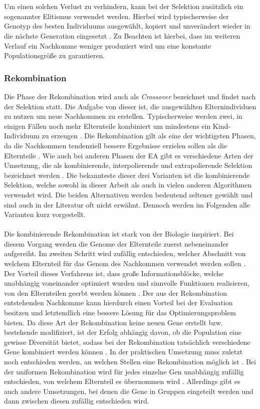 \\\\
Um einen solchen Verlust zu verhindern, kann bei der Selektion zusätzlich ein sogenannter Elitismus verwendet werden. Hierbei wird typischerweise der Genotyp des besten Individuums ausgewählt, kopiert und unverändert wieder in die nächste Generation eingesetzt \cite{such2017deep}. Zu Beachten ist hierbei, dass im weiteren Verlauf ein Nachkomme weniger produziert wird um eine konstante Populationsgröße zu garantieren. 

\subsubsection{Rekombination}
\label{subsubsec:ea_recombination}
Die Phase der Rekombination wird auch als \emph{Crossover} bezeichnet und findet nach der Selektion statt. Die Aufgabe von dieser ist, die ausgewählten Elternindividuen zu nutzen um neue Nachkommen zu erstellen. Typischerweise werden zwei, in einigen Fällen noch mehr Elternteile kombiniert um mindestens ein Kind-Individuum zu erzeugen \cite{weicker2015evolutionare}. Die Rekombination gilt als eine der wichtigsten Phasen, da die Nachkommen tendenziell bessere Ergebnisse erzielen sollen als die Elternteile \cite{russell2013kunstliche}. Wie auch bei anderen Phasen der \ac{EA} gibt es verschiedene Arten der Umsetzung, die als kombinierende, interpolierende und extrapolierende Selektion bezeichnet werden \cite{weicker2015evolutionare}. Die bekannteste dieser drei Varianten ist die kombinierende Selektion, welche sowohl in dieser Arbeit als auch in vielen anderen Algorithmen verwendet wird. Die beiden Alternativen werden bedeutend seltener gewählt und sind auch in der Literatur oft nicht erwähnt. Dennoch werden im Folgenden alle Varianten kurz vorgestellt.
\\\\
Die kombinierende Rekombination ist stark von der Biologie inspiriert. Bei diesem Vorgang werden die Genome der Elternteile zuerst nebeneinander aufgereiht. Im zweiten Schritt wird zufällig entschieden, welcher Abschnitt von welchem Elternteil für das Genom des Nachkommen verwendet werden sollen \cite{weicker2015evolutionare}. Der Vorteil dieses Verfahrens ist, dass große Informationsblöcke, welche unabhängig voneinander optimiert wurden und sinnvolle Funktionen realisieren, von den Elternteilen geerbt werden können \cite{russell2013kunstliche}. Der aus der Rekombination entstehenden Nachkomme kann hierdurch einen Vorteil bei der Evaluation besitzen und letztendlich eine bessere Lösung für das Optimierungsproblem bieten. Da diese Art der Rekombination keine neuen Gene erstellt bzw. bestehende modifiziert, ist der Erfolg abhängig davon, ob die Population eine gewisse Diversität bietet, sodass bei der Rekombination tatsächlich verschiedene Gene kombiniert werden können \cite{weicker2015evolutionare}. In der praktischen Umsetzung muss zuletzt noch entschieden werden, an welchen Stellen eine Rekombination möglich ist \cite{rojas1996neural}. Bei der uniformen Rekombination wird für jedes einzelne Gen unabhängig zufällig entschieden, von welchem Elternteil es übernommen wird \cite{weicker2015evolutionare}. Allerdings gibt es auch andere Umsetzungen, bei denen die Gene in Gruppen eingeteilt werden und dann zwischen diesen zufällig entschieden wird.
